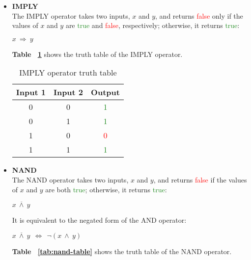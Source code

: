 \documentclass[]{usiinfbachelorproject}
\begin{document}
\begin{itemize}
\begin{table}[H]
            \label{tab:zero-dc-table}
        \end{table}
    \item \textbf{IMPLY}
        \vspace{0.2cm} \\
        The IMPLY operator takes two inputs, $x$ and $y$, and returns \textcolor{red}{false} only if the values of $x$ and $y$ are \textcolor{ForestGreen}{true} and \textcolor{red}{false}, respectively; otherwise, it returns \textcolor{ForestGreen}{true}:
        \begin{center}
            $x \ \Longrightarrow \ y$
        \end{center}
        \textbf{Table ~\ref{tab:imply-table}} shows the truth table of the IMPLY operator.
        \begin{table}[H]
            \centering
            \begin{tabular}{|c|c|c|}
                \hline
                \textbf{Input 1} & \textbf{Input 2} & \textbf{Output} \\
                \hline
                0 & 0 & \textcolor{ForestGreen}{1} \\
                \hline
                0 & 1 & \textcolor{ForestGreen}{1} \\
                \hline
                1 & 0 & \textcolor{red}{0} \\
                \hline
                1 & 1 & \textcolor{ForestGreen}{1} \\
                \hline
            \end{tabular}
            \caption{IMPLY operator truth table}
            \label{tab:imply-table}
        \end{table}
    \item \textbf{NAND}
        \vspace{0.2cm} \\
        The NAND operator takes two inputs, $x$ and $y$, and returns \textcolor{red}{false} if the values of $x$ and $y$ are both \textcolor{ForestGreen}{true}; otherwise, it returns \textcolor{ForestGreen}{true}:
        \begin{center}
            $x \ \overline{\land} \ y$
        \end{center}
        It is equivalent to the negated form of the AND operator:
        \begin{center}
            $x \ \overline{\land} \ y \ \ \Longleftrightarrow \ \ \neg(x \ \land \ y)$
        \end{center}
        \textbf{Table ~\ref{tab:nand-table}} shows the truth table of the NAND operator.

\end{itemize}
\end{document}
